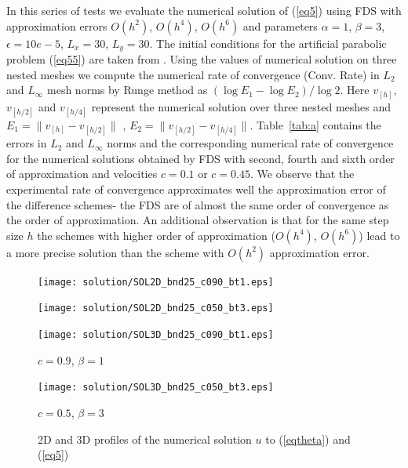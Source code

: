 \documentclass[leqno,11pt]{book}
\newcommand{\rf}[1]{(\ref{#1})}
\begin{document}


 In this series of tests we evaluate the numerical solution of \rf{eq5} using FDS with approximation errors $O(h^2)$, $O(h^4)$, $O(h^6)$ and parameters  
 $\alpha = 1$,   $\beta=3$,  $\epsilon = 10e-5$, 
$L_{x }= 30$, $L_{y} = 30$.
The initial conditions for the artificial parabolic problem \rf{eq55} are taken from  \cite{Ch2011}. 
Using the values of numerical solution on three nested meshes we compute the numerical rate of convergence (Conv. Rate) in $L_2$ and $L_{\infty}$ mesh norms
by Runge method as $(\log E_1 -\log E_2)/\log 2$.  Here  $v_{[h]}$, $v_{ {[h/2]}  }$ and  $v_{ {[h/4]}  }$ represent the numerical solution over three nested meshes and $E_1=\|v_{[h]}-v_{[h/2]}\|$ , $E_2=\|v_{[h/2]}-v_{[h/4]}\|$.  
Table~\ref{tab:a} contains the errors in $L_2$ and $L_{\infty}$ norms and the corresponding numerical rate of convergence for the numerical solutions obtained by FDS with second, fourth and sixth order of approximation and   velocities  $c=0.1$  or $c=0.45$.
We observe that the experimental rate of convergence approximates well the approximation error of the difference schemes- the FDS are of  almost the same order of convergence as the order of approximation. An additional observation  is that  for  the same step size $h$ the schemes with higher order of approximation ($O(h^4)$, $O(h^6)$) lead to a more precise solution than the scheme with $O(h^2)$ approximation error. 

\begin{figure}[ht]
	\begin{minipage}[b]{0.5\linewidth}
		\raggedleft
		\texttt{[image: solution/SOL2D\_bnd25\_c090\_bt1.eps]}
	\end{minipage}
	\begin{minipage}[b]{0.5\linewidth}
		\raggedright
		\texttt{[image: solution/SOL2D\_bnd25\_c050\_bt3.eps]}
	\end{minipage}
	\begin{minipage}[b]{0.45\linewidth}
		 \raggedleft
		\texttt{[image: solution/SOL3D\_bnd25\_c090\_bt1.eps]}
		\centerline{$c = 0.9$, $\beta = 1$}
	\end{minipage}
	\begin{minipage}[b]{0.5\linewidth}
		 \raggedright
		\texttt{[image: solution/SOL3D\_bnd25\_c050\_bt3.eps]}
		\centerline{$c = 0.5$, $\beta = 3$}
	\end{minipage}
	\caption{2D and 3D profiles of the numerical solution $u$ to \rf{eqtheta} and \rf{eq5}}
	\label{fig:solutions}
\end{figure}
\end{document}
